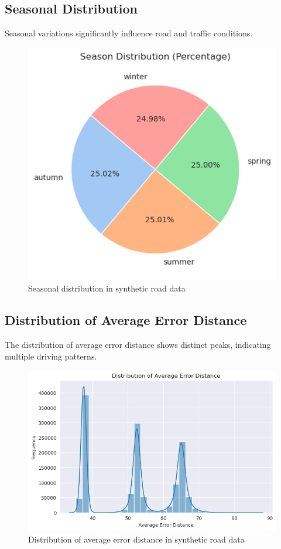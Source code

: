 \documentclass[sigplan,screen]{acmart}
\begin{document}
\subsection{Seasonal Distribution}
Seasonal variations significantly influence road and traffic conditions.

\begin{figure}[h]
    \centering
    \includegraphics[width=0.8\linewidth]{images/season_dist.png}
    \caption{Seasonal distribution in synthetic road data}
    \label{fig:season_dist}
\end{figure}

\subsection{Distribution of Average Error Distance}
The distribution of average error distance shows distinct peaks, indicating multiple driving patterns.

\begin{figure}[h]
    \centering
    \includegraphics[width=0.8\linewidth]{images/avg_error.png}
    \caption{Distribution of average error distance in synthetic road data}
    \label{fig:error_dist}
\end{figure}
\end{document}
